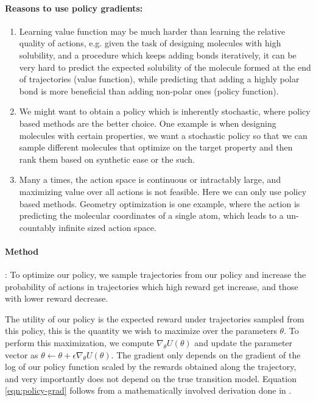 \paragraph{Reasons to use policy gradients:}
\begin{enumerate}
    \item Learning value function may be much harder than learning the relative quality of actions, e.g. given the task of designing molecules with high solubility, and a procedure which keeps adding bonds iteratively, it can be very hard to predict the expected solubility of the molecule formed at the end of trajectories (value function), while predicting that adding a highly polar bond is more beneficial than adding non-polar ones (policy function).
    \item We might want to obtain a policy which is inherently stochastic, where policy based methods are the better choice. One example is when designing molecules with certain properties, we want a stochastic policy so that we can sample different molecules that optimize on the target property and then rank them based on synthetic ease or the such.
    \item Many a times, the action space is continuous or intractably large, and maximizing value over all actions is not feasible. Here we can only use policy based methods. Geometry optimization is one example, where the action is predicting the molecular coordinates of a single atom, which leads to a un-countably infinite sized action space.
\end{enumerate}

\paragraph{Method}:
To optimize our policy, we sample trajectories from our policy and increase the probability of actions in trajectories which high reward get increase, and those with lower reward decrease.

The utility of our policy is the expected reward under trajectories sampled from this policy, this is the quantity we wish to maximize over the parameters $\theta$. To perform this maximization, we compute $\nabla_\theta U(\theta)$ and update the parameter vector as $\theta \leftarrow \theta + \epsilon \nabla_\theta U(\theta)$. The gradient only depends on the gradient of the log of our policy function scaled by the rewards obtained along the trajectory, and very importantly does not depend on the true transition model. Equation \ref{eqn:policy-grad} follows from a mathematically involved derivation done in \cite{}.

